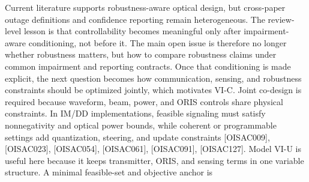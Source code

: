{} Current literature supports robustness-aware optical design, but cross-paper outage definitions and confidence reporting remain heterogeneous. The review-level lesson is that controllability becomes meaningful only after impairment-aware conditioning, not before it. The main open issue is therefore no longer whether robustness matters, but how to compare robustness claims under common impairment and reporting contracts. Once that conditioning is made explicit, the next question becomes how communication, sensing, and robustness constraints should be optimized jointly, which motivates VI-C.\markdownRendererInterblockSeparator
{}
\markdownRendererSectionEnd \markdownRendererSectionBegin
{}\markdownRendererInterblockSeparator
{}Joint co-design is required because waveform, beam, power, and ORIS controls share physical constraints. In IM/DD implementations, feasible signaling must satisfy nonnegativity and optical power bounds, while coherent or programmable settings add quantization, steering, and update constraints [O\markdownRendererUnderscore{}ISAC\markdownRendererUnderscore{}009], [O\markdownRendererUnderscore{}ISAC\markdownRendererUnderscore{}023], [O\markdownRendererUnderscore{}ISAC\markdownRendererUnderscore{}054], [O\markdownRendererUnderscore{}ISAC\markdownRendererUnderscore{}061], [O\markdownRendererUnderscore{}ISAC\markdownRendererUnderscore{}091], [O\markdownRendererUnderscore{}ISAC\markdownRendererUnderscore{}127]. Model VI-U is useful here because it keeps transmitter, ORIS, and sensing terms in one variable structure.\markdownRendererParagraphSeparator
{}A minimal feasible-set and objective anchor is\markdownRendererParagraphSeparator
{}\markdownRendererSoftLineBreak
{}\markdownRendererParagraphSeparator
